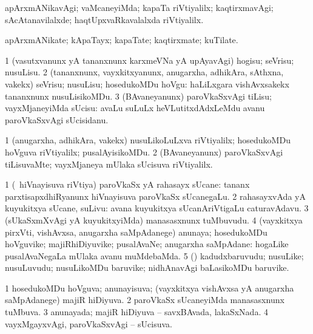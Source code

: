 \bentry
{}
\gl{\kirxvi}
\bmng
apArxmANikavAgi; vaMcaneyiMda; kapaTa riVtiyalilx; kaqtirxmavAgi; sAcAtanavilalxde; haqtUpxvaRkavalalxda riVtiyalilx. 
\emng
\eentry

\bentry
{}
\gl{\nA}
\bmng
apArxmANikate; kApaTayx; kapaTate; kaqtirxmate; kuTilate. 
\emng
\eentry

\bentry
{}
\gl{\sakirx}
\bmng
\bnum
\num{1} (vasutxvanunx yA tananxnunx karxmeVNa yA upAyavAgi) hogisu; seVrisu; nusuLisu. 
\num{2} (tananxnunx, vayxkitxyanunx, anugarxha, adhikAra, sAthxna, \mo vakekx) seVrisu; nusuLisu; hosedukoMDu hoVgu:  haLiLxgara vishAvxsakekx tananxnunx nusuLisikoMDu. 
\num{3} (BAvaneyanunx) paroVkaSxvAgi tiLisu; vayxMjaneyiMda sUcisu:  avaLu suLuLx heVLutitxdAdxLeMdu avanu paroVkaSxvAgi sUcisidanu. 
\enum
\emng
\eentry

\bentry
{}
\gl{\kirxvi}
\bmng
\bnum
\num{1} (anugarxha, adhikAra, \mo vakekx) nusuLikoLuLxva riVtiyalilx; hosedukoMDu hoVguva riVtiyalilx; pusalAyisikoMDu. 
\num{2} (BAvaneyanunx) paroVkaSxvAgi tiLisuvaMte; vayxMjaneya mUlaka sUcisuva riVtiyalilx. 
\enum
\emng
\eentry

\bentry
{}
\gl{\nA}
\bmng
\bnum
\num{1} (\kanmu\ hiVnayisuva riVtiya) paroVkaSx yA rahasayx sUcane:  tananx parxtisapxdhiRyanunx hiVnayisuva paroVkaSx sUcanegaLu. 
\num{2} rahasayxvAda yA kuyukitxya sUcane, suLivu:  avana kuyukitxya sUcanAriVtigaLu caturavAdavu. 
\num{3} (sUkaSxmXvAgi yA kuyukitxyiMda) manasasxnunx tuMbuvudu. 
\num{4} (vayxkitxya pirxVti, vishAvxsa, anugarxha saMpAdanege) anunaya; hosedukoMDu hoVguvike; majiRhiDiyuvike; pusalAvaNe; anugarxha saMpAdane:  hogaLike pusalAvaNegaLa mUlaka avanu muMdebaMda. 
\num{5} (\pArxparx) kadudxbaruvudu; nusuLike; nusuLuvudu; nusuLikoMDu baruvike; nidhAnavAgi baLasikoMDu baruvike. 
\enum
\emng
\eentry

\bentry
{}
\gl{\gu}
\bmng
\bnum
\num{1} hosedukoMDu hoVguva; anunayisuva; (vayxkitxya vishAvxsa yA anugarxha saMpAdanege) majiR hiDiyuva. 
\num{2} paroVkaSx sUcaneyiMda manasasxnunx tuMbuva. 
\num{3} anunayada; majiR hiDiyuva -- savxBAvada, lakaSxNada. 
\num{4} vayxMgayxvAgi, paroVkaSxvAgi -- sUcisuva. 
\enum
\emng
\eentry


